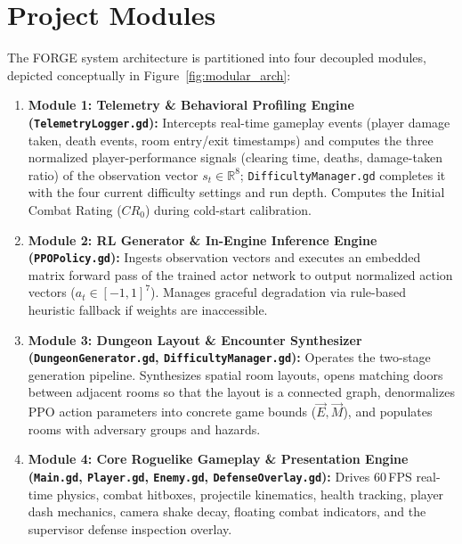 \section{Project Modules}
The FORGE system architecture is partitioned into four decoupled modules, depicted conceptually in Figure~\ref{fig:modular_arch}:
\begin{enumerate}
    \item \textbf{Module 1: Telemetry \& Behavioral Profiling Engine (\texttt{TelemetryLogger.gd}):} Intercepts real-time gameplay events (player damage taken, death events, room entry/exit timestamps) and computes the three normalized player-performance signals (clearing time, deaths, damage-taken ratio) of the observation vector $s_t \in \mathbb{R}^8$; \texttt{DifficultyManager.gd} completes it with the four current difficulty settings and run depth. Computes the Initial Combat Rating ($CR_0$) during cold-start calibration.
    \item \textbf{Module 2: RL Generator \& In-Engine Inference Engine (\texttt{PPOPolicy.gd}):} Ingests observation vectors and executes an embedded matrix forward pass of the trained actor network to output normalized action vectors ($a_t \in [-1, 1]^7$). Manages graceful degradation via rule-based heuristic fallback if weights are inaccessible.
    \item \textbf{Module 3: Dungeon Layout \& Encounter Synthesizer (\texttt{DungeonGenerator.gd}, \texttt{DifficultyManager.gd}):} Operates the two-stage generation pipeline. Synthesizes spatial room layouts, opens matching doors between adjacent rooms so that the layout is a connected graph, denormalizes PPO action parameters into concrete game bounds ($\vec{E}, \vec{M}$), and populates rooms with adversary groups and hazards.
    \item \textbf{Module 4: Core Roguelike Gameplay \& Presentation Engine (\texttt{Main.gd}, \texttt{Player.gd}, \texttt{Enemy.gd}, \texttt{DefenseOverlay.gd}):} Drives 60\,FPS real-time physics, combat hitboxes, projectile kinematics, health tracking, player dash mechanics, camera shake decay, floating combat indicators, and the supervisor defense inspection overlay.
\end{enumerate}

